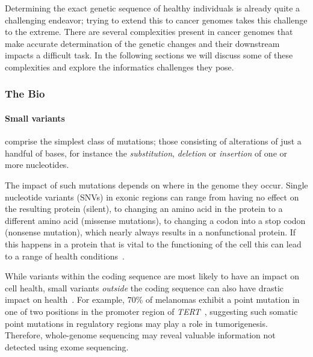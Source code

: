 \begin{justify}
Determining the exact genetic sequence of healthy individuals is already quite a challenging endeavor; trying to extend this to cancer genomes takes this challenge to the extreme. There are several complexities present in cancer genomes that make accurate determination of the genetic changes and their downstream impacts a difficult task. In the following sections we will discuss some of these complexities and explore the informatics challenges they pose.

\subsubsection{The Bio}

\paragraph{Small variants} comprise the simplest class of mutations; those consisting of alterations of just a handful of bases, for instance the \emph{substitution}, \emph{deletion} or \emph{insertion} of one or more nucleotides.

The impact of such mutations depends on where in the genome they occur. Single nucleotide variants (SNVs) in exonic regions can range from having no effect on the resulting protein (silent), to changing an amino acid in the protein to a different amino acid (missense mutations), to changing a codon into a stop codon (nonsense mutation), which nearly always results in a nonfunctional protein. If this happens in a protein that is vital to the functioning of the cell this can lead to a range of health conditions~\cite{cargill1999characterization}.

While variants within the coding sequence are most likely to have an impact on cell health, small variants \emph{outside} the coding sequence can also have drastic impact on health~\cite{zhang2015non}. For example, 70\% of melanomas exhibit a point mutation in one of two positions in the promoter region of \emph{TERT}~\cite{horn2013tert,huang2013highly}, suggesting such somatic point mutations in regulatory regions may play a role in tumorigenesis. Therefore, whole-genome sequencing may reveal valuable information not detected using exome sequencing.



\end{justify}
